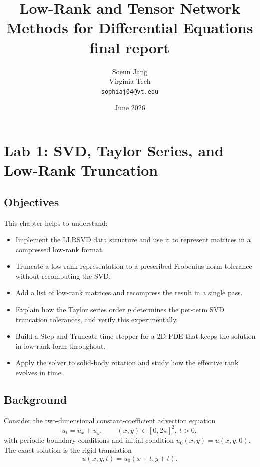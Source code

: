 \documentclass[11pt]{report}
\title{%
    \textbf{Low-Rank and Tensor Network Methods for Differential Equations}\\[0.5em]
    final report
}
\author{Soeun Jang \\ Virginia Tech \\ \texttt{sophiaj04@vt.edu}}
\date{June 2026}
\begin{document}
\maketitle
\tableofcontents

\newpage


\chapter{Lab 1: SVD, Taylor Series, and Low-Rank Truncation}

\section{Objectives}

This chapter helps to understand:
\begin{itemize}[leftmargin=*]
    \item Implement the LLRSVD data structure and use it to represent matrices in a compressed low-rank format.
    \item Truncate a low-rank representation to a prescribed Frobenius-norm tolerance without recomputing the SVD.
    \item Add a list of low-rank matrices and recompress the result in a single pass.
    \item Explain how the Taylor series order \(p\) determines the per-term SVD truncation tolerances, and verify this experimentally.
    \item Build a Step-and-Truncate time-stepper for a 2D PDE that keeps the solution in low-rank form throughout.
    \item Apply the solver to solid-body rotation and study how the effective rank evolves in time.
\end{itemize}

\section{Background}

Consider the two-dimensional constant-coefficient advection equation
\begin{equation}
    u_t = u_x + u_y, \qquad (x,y) \in [0,2\pi]^2,\ t>0,
\end{equation}
with periodic boundary conditions and initial condition \(u_0(x,y) = u(x,y,0)\).
The exact solution is the rigid translation
\begin{equation}
    u(x,y,t) = u_0(x+t, y+t).
\end{equation}
\end{document}
